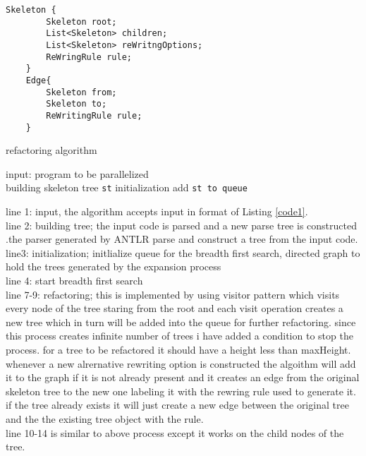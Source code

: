 \documentclass[12pt]{report}
\begin{document}
\begin{lstlisting}[caption={skeleton tree}, label={tree1}]
	Skeleton {
		Skeleton root;
		List<Skeleton> children;
		List<Skeleton> reWritngOptions;
		ReWringRule rule;
	}
	Edge{
		Skeleton from;
		Skeleton to;
		ReWritingRule rule;
	}
\end{lstlisting}
\begin{algorithm}[H]
\SetAlgoLined
 \caption {refactoring algorithm}\label{euclid}
  input: program to be parallelized\\
  building skeleton tree \texttt{st}\;
  initialization\;
  add \texttt{st to queue}\\

\end{algorithm}
line 1: input, the algorithm accepts input in format of  Listing \ref{code1}.\\
line 2: building tree; the input code is parsed and a new parse tree is constructed .the parser generated by ANTLR parse and construct a tree from the input code.\\
line3: initialization; initlialize queue for the breadth first search, directed graph to hold the trees generated by the expansion process\\
line 4: start breadth first search\\
line 7-9: refactoring; this is implemented by using visitor pattern which visits every node of the tree staring from the root and each visit operation creates a new tree which in turn will be added into the queue for further refactoring. since this process creates infinite number of trees i have added a condition to stop the process. for a tree to be refactored it should have a height less than maxHeight.
whenever a new alrernative rewriting option is constructed the algoithm will add it to the graph if it is not already present and it creates an edge from the original skeleton tree to the new one labeling it with the rewring rule used to generate it. if the tree already exists it will just create a new edge between the original tree and the the existing tree object with the rule. \\
line 10-14 is similar to above process except it works on the child nodes of the tree.
\end{document}
